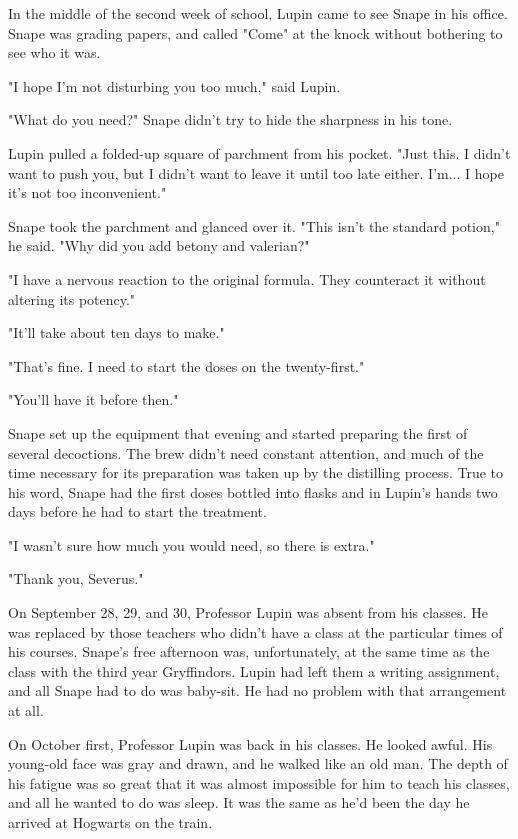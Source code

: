 \documentclass[a4paper,11pt]{article}
\begin{document}
In the middle of the second week of school, Lupin came to see Snape in his office. Snape was grading papers, and called "Come" at the knock without bothering to see who it was.

"I hope I'm not disturbing you too much," said Lupin.

"What do you need?" Snape didn't try to hide the sharpness in his tone.

Lupin pulled a folded-up square of parchment from his pocket. "Just this. I didn't want to push you, but I didn't want to leave it until too late either. I'm... I hope it's not too inconvenient."

Snape took the parchment and glanced over it. "This isn't the standard potion," he said. "Why did you add betony and valerian?"

"I have a nervous reaction to the original formula. They counteract it without altering its potency."

"It'll take about ten days to make."

"That's fine. I need to start the doses on the twenty-first."

"You'll have it before then."

Snape set up the equipment that evening and started preparing the first of several decoctions. The brew didn't need constant attention, and much of the time necessary for its preparation was taken up by the distilling process. True to his word, Snape had the first doses bottled into flasks and in Lupin's hands two days before he had to start the treatment.

"I wasn't sure how much you would need, so there is extra."

"Thank you, Severus."

On September 28, 29, and 30, Professor Lupin was absent from his classes. He was replaced by those teachers who didn't have a class at the particular times of his courses. Snape's free afternoon was, unfortunately, at the same time as the class with the third year Gryffindors. Lupin had left them a writing assignment, and all Snape had to do was baby-sit. He had no problem with that arrangement at all.

On October first, Professor Lupin was back in his classes. He looked awful. His young-old face was gray and drawn, and he walked like an old man. The depth of his fatigue was so great that it was almost impossible for him to teach his classes, and all he wanted to do was sleep. It was the same as he'd been the day he arrived at Hogwarts on the train.
\end{document}
